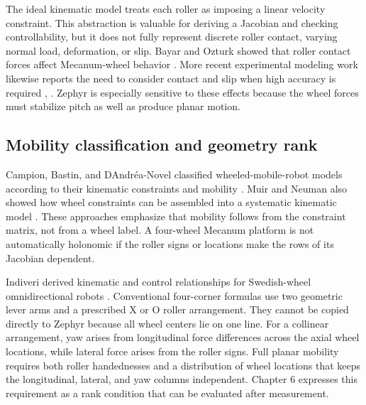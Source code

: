 The ideal kinematic model treats each roller as imposing a linear
velocity constraint. This abstraction is valuable for deriving a
Jacobian and checking controllability, but it does not fully represent
discrete roller contact, varying normal load, deformation, or slip.
Bayar and Ozturk showed that roller contact forces affect Mecanum-wheel
behavior \cite{bayar2020contact}. More recent experimental modeling work likewise
reports the need to consider contact and slip when high accuracy is
required \cite{bhargava2026review}, \cite{barcenas2025robust}. Zephyr is especially sensitive to these
effects because the wheel forces must stabilize pitch as well as produce
planar motion.

\subsection{Mobility classification and geometry rank}\label{mobility-classification-and-geometry-rank}

Campion, Bastin, and D\textquotesingle Andréa-Novel classified
wheeled-mobile-robot models according to their kinematic constraints and
mobility \cite{campion1996structural}. Muir and Neuman also showed how wheel constraints can
be assembled into a systematic kinematic model \cite{muir1987kinematic}. These
approaches emphasize that mobility follows from the constraint matrix,
not from a wheel label. A four-wheel Mecanum platform is not
automatically holonomic if the roller signs or locations make the rows
of its Jacobian dependent.

Indiveri derived kinematic and control relationships for Swedish-wheel
omnidirectional robots \cite{indiveri2009swedish}. Conventional four-corner formulas use
two geometric lever arms and a prescribed X or O roller arrangement.
They cannot be copied directly to Zephyr because all wheel centers lie
on one line. For a collinear arrangement, yaw arises from longitudinal
force differences across the axial wheel locations, while lateral force
arises from the roller signs. Full planar mobility requires both roller
handednesses and a distribution of wheel locations that keeps the
longitudinal, lateral, and yaw columns independent. Chapter 6 expresses
this requirement as a rank condition that can be evaluated after
measurement.


